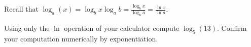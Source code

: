 \begin{frame}

Recall that $\log_{a}(x)=\log_b x \log_{a} b=\frac{\log_b x}{\log_{b} a}=  \frac{\ln x}{\ln a}$.
\begin{example}
Using only the $\ln$ operation of your calculator compute $\log_{5}(13)$. Confirm your computation numerically by exponentiation.
\end{example}
\end{frame}